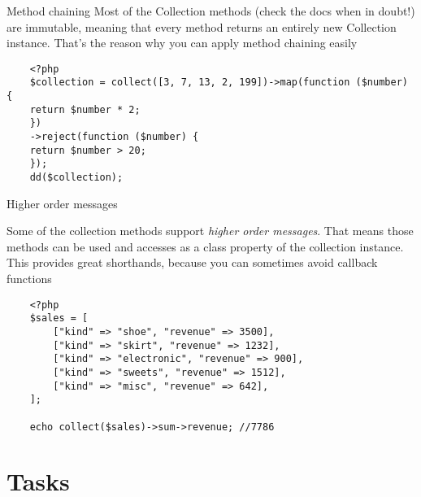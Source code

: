 \begin{frame}[fragile]{Method chaining}
	Most of the Collection methods (check the docs when in doubt!) are immutable, meaning that every method returns an entirely new Collection instance. That's the reason why you can apply method chaining easily \pause
	
	\begin{lstlisting}
	<?php
	$collection = collect([3, 7, 13, 2, 199])->map(function ($number) {
	return $number * 2;
	})
	->reject(function ($number) {
	return $number > 20;
	});
	dd($collection);
	\end{lstlisting}
\end{frame}

\begin{frame}[fragile]{Higher order messages}
	
	Some of the collection methods support \textit{higher order messages}. That means those methods can be used and accesses as a class property of the collection instance. This provides great shorthands, because you can sometimes avoid callback functions\pause
	
	\begin{lstlisting}
	<?php
	$sales = [
		["kind" => "shoe", "revenue" => 3500],
		["kind" => "skirt", "revenue" => 1232],
		["kind" => "electronic", "revenue" => 900],
		["kind" => "sweets", "revenue" => 1512],
		["kind" => "misc", "revenue" => 642],
	];

	echo collect($sales)->sum->revenue; //7786
	\end{lstlisting}
\end{frame}

\section{Tasks}

